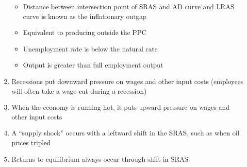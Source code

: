 \documentclass[12pt]{article}
\begin{document}
\begin{enumerate}
\begin{itemize}
      \item Distance between intersection point of SRAS and AD curve and LRAS curve is known as the inflationary outgap

      \item Equivalent to producing outside the PPC

      \item Unemployment rate is below the natural rate

      \item Output is greater than full employment output

    \end{itemize}

    \begin{center}
    \end{center}

  \item Recessions put downward pressure on wages and other input costs (employees will often take a wage cut during a recession)

  \item When the economy is running hot, it puts upward pressure on wages and other input costs

  \item A “supply shock” occurs with a leftward shift in the SRAS, such as when oil prices tripled

  \item Returns to equilibrium always occur through shift in SRAS

\end{enumerate}
\end{document}
